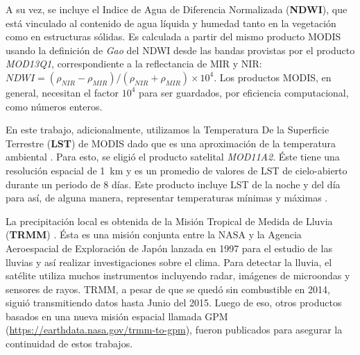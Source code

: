   \par A su vez, se incluye el Indice de Agua de Diferencia Normalizada
    (\textbf{NDWI}), que está vinculado al contenido de agua líquida y humedad
    tanto en la vegetación como en estructuras sólidas.
    Es calculada a partir del mismo producto MODIS usando la definición de
    \textit{Gao} \cite{gao_ndwi} del NDWI desde las bandas provistas por
    el producto \textit{MOD13Q1}, correspondiente a la reflectancia de MIR y NIR:
    $NDWI =  (\rho_{NIR} - \rho_{MIR}) / (\rho_{NIR}  + \rho_{MIR} ) \times 10^4$.
    Los productos MODIS, en general, necesitan el factor $10^{4}$ para ser guardados,
    por eficiencia computacional, como números enteros.

  \par En este trabajo, adicionalmente, utilizamos la Temperatura De la Superficie
    Terrestre (\textbf{LST}) de MODIS dado que es una aproximación de la
    temperatura ambiental \cite{infectious_diseases, surface_temp, temp_algorithm}.
    Para esto, se eligió el producto satelital \textit{MOD11A2}. Éste tiene una
    resolución espacial de \SI{1}{\kilo\meter} y es un promedio de valores de
    LST de cielo-abierto durante un periodo de 8 días. Este producto incluye
    LST de la noche y del día para así, de alguna manera, representar
    temperaturas mínimas y máximas \cite{lst_surface}.

  \par La precipitación local es obtenida de la Misión Tropical de Medida de Lluvia
    (\textbf{TRMM}) \cite{trmm_mision}. Ésta es una misión conjunta entre la
    NASA y la Agencia Aeroespacial de Exploración de Japón lanzada en 1997
    para el estudio de las lluvias y así realizar investigaciones sobre el
    clima. Para detectar la lluvia, el satélite utiliza muchos instrumentos
    incluyendo radar, imágenes de microondas y sensores de rayos. TRMM, a pesar
    de que se quedó sin combustible en 2014, siguió transmitiendo datos hasta
    Junio del 2015.
    Luego de eso, otros productos basados en una nueva misión espacial llamada
    GPM (\url{https://earthdata.nasa.gov/trmm-to-gpm}), fueron publicados para
    asegurar la continuidad de estos trabajos.


